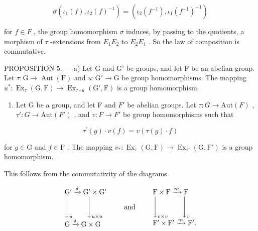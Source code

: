 \[
\sigma (\iota_ {1} (f), \iota_ {2} (f) ^ {- 1}) = (\iota_ {2} (f ^ {- 1}), \iota_ {1} (f ^ {- 1}) ^ {- 1})
\]

for \(f \in F\) , the group homomorphism \(\sigma\) induces, by passing to the quotients, a morphism of \(\tau\) -extensions from \(E_{1}E_{2}\) to \(E_{2}E_{1}\) . So the law of composition is commutative.

PROPOSITION 5. --- a) Let G and G' be groups, and let F be an abelian group. Let \(\tau: \mathrm{G} \to \operatorname{Aut}(\mathrm{F})\) and \(u: \mathrm{G}' \to \mathrm{G}\) be group homomorphisms. The mapping \(u^*: \operatorname{Ex}_{\tau}(\mathrm{G}, \mathrm{F}) \to \operatorname{Ex}_{\tau \circ u}(\mathrm{G}', \mathrm{F})\) is a group homomorphism.

\begin{enumerate}
\def\labelenumi{\alph{enumi})}
\setcounter{enumi}{1}
\tightlist
\item
  Let G be a group, and let F and \(F'\) be abelian groups. Let \(\tau: G \to \text{Aut}(F)\) , \(\tau': G \to \text{Aut}(F')\) , and \(v: F \to F'\) be group homomorphisms such that
\end{enumerate}

\[
\tau^ {\prime} (g) \cdot v (f) = v (\tau (g) \cdot f)
\]

for \(g \in \mathrm{G}\) and \(f \in \mathrm{F}\) . The mapping \(v_{*} : \operatorname{Ex}_{\tau}(\mathrm{G}, \mathrm{F}) \to \operatorname{Ex}_{\tau'}(\mathrm{G}, \mathrm{F}')\) is a group homomorphism.

This follows from the commutativity of the diagrams

\[
\begin{array}{l} \mathrm{G} ^ {\prime} \xrightarrow {\delta} \mathrm{G} ^ {\prime} \times \mathrm{G} ^ {\prime} \\ \Biggl \downarrow_ {u} \qquad \Biggl \downarrow_ {u \times u} \\ \mathrm{G} \xrightarrow {\delta} \mathrm{G} \times \mathrm{G} \end{array} \qquad \text {and} \qquad \begin{array}{l} \mathrm{F} \times \mathrm{F} \xrightarrow {m} \mathrm{F} \\ \Biggl \downarrow_ {v \times v} \qquad \Biggl \downarrow_ {v} \\ \mathrm{F} ^ {\prime} \times \mathrm{F} ^ {\prime} \xrightarrow {m} \mathrm{F} ^ {\prime}. \end{array}
\]

